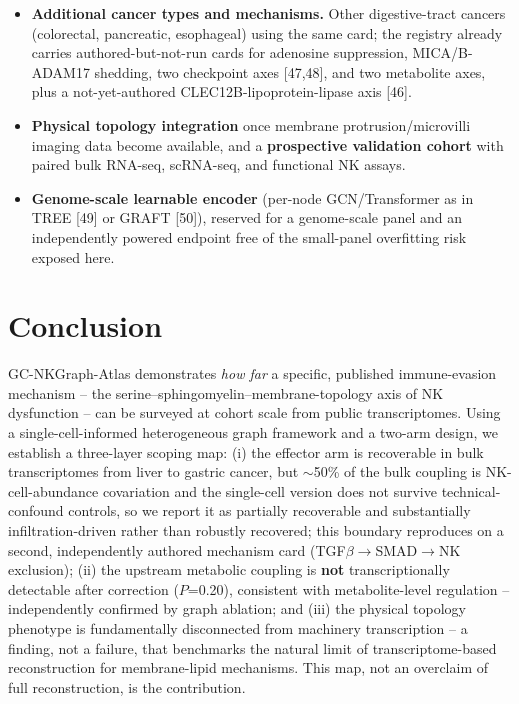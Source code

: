 \documentclass[modern,large,numbered,nocrop]{oup-authoring-template}
\begin{document}
\begin{itemize}
\item \textbf{Additional cancer types and mechanisms.} Other digestive-tract cancers (colorectal, pancreatic, esophageal) using the same card; the registry already carries authored-but-not-run cards for adenosine suppression, MICA/B-ADAM17 shedding, two checkpoint axes [47,48], and two metabolite axes, plus a not-yet-authored CLEC12B-lipoprotein-lipase axis [46].
\item \textbf{Physical topology integration} once membrane protrusion/microvilli imaging data become available, and a \textbf{prospective validation cohort} with paired bulk RNA-seq, scRNA-seq, and functional NK assays.
\item \textbf{Genome-scale learnable encoder} (per-node GCN/Transformer as in TREE [49] or GRAFT [50]), reserved for a genome-scale panel and an independently powered endpoint free of the small-panel overfitting risk exposed here.
\end{itemize}

\section{Conclusion}

GC-NKGraph-Atlas demonstrates \textit{how far} a specific, published immune-evasion mechanism -- the serine--sphingomyelin--membrane-topology axis of NK dysfunction -- can be surveyed at cohort scale from public transcriptomes. Using a single-cell-informed heterogeneous graph framework and a two-arm design, we establish a three-layer scoping map: (i) the effector arm is recoverable in bulk transcriptomes from liver to gastric cancer, but $\sim$50\% of the bulk coupling is NK-cell-abundance covariation and the single-cell version does not survive technical-confound controls, so we report it as partially recoverable and substantially infiltration-driven rather than robustly recovered; this boundary reproduces on a second, independently authored mechanism card (TGF$\beta$$\to$SMAD$\to$NK exclusion); (ii) the upstream metabolic coupling is \textbf{not} transcriptionally detectable after correction ($P$=0.20), consistent with metabolite-level regulation -- independently confirmed by graph ablation; and (iii) the physical topology phenotype is fundamentally disconnected from machinery transcription -- a finding, not a failure, that benchmarks the natural limit of transcriptome-based reconstruction for membrane-lipid mechanisms. This map, not an overclaim of full reconstruction, is the contribution.
\end{document}
